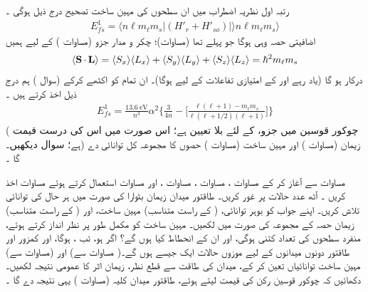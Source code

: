  رتبہ اول نظریہ اضطراب میں ان سطحوں کی مہین ساخت تصحیح درج ذیل ہوگی ۔
\begin{align}\label{مساوات_غیر_مضطرب_نظریہ_اضطراب_پہلی_تصحیح}
E_{fs}^1 = \langle n\ell m_{\ell} m_s | (H'_r + H'_{so}) | \rangle n\ell m_{\ell} m_s \rangle
\end{align}
اضافیتی حصہ وہی ہوگا جو پہلے تھا (مساوات)؛   چکر و مدار جزو  (مساوات )   کے لیے ہمیں
\begin{align}\label{مساوات_غیر_مضطرب_نقطی_ضرب}
\langle \operatorname{\mathbf{S}} \cdot \operatorname{\mathbf{L}} \rangle = \langle S_x \rangle \langle L_x \rangle + \langle S_y \rangle \langle L_y \rangle + \langle S_z \rangle \langle L_z \rangle = \hslash^2 m_{\ell} m_s
\end{align}
درکار ہو گا (یاد  رہے   اور  کے  امتیازی تفاعلات کے لیے  ہوگا)۔   ان تمام کو اکٹھے کرکے (سوال  ) ہم درج ذیل اخذ کرتے ہیں ۔
\begin{align}\label{مساوت_غیر_مضطرب_طاقتور_مہین_ساخت_حصہ}
E_{fs}^1 = \frac{\SI{13.6}{\electronvolt}}{n^3} \alpha^2 \Big \{ \frac{3}{4n} - \Big [ \frac{\ell (\ell  + 1) - m_\ell  m_s}{\ell (\ell  + 1/2)(\ell  + 1)} \Big ] \Big\}
\end{align}
( چوکور  قوسین    میں جزو،    کے لئے بلا تعیین ہے؛  اس  صورت میں اس کی درست قیمت    ہے؛  سوال    دیکھیں۔) زیمان   (مساوات )  اور مہین ساخت   (مساوات  )    حصوں کا مجموعہ کل توانائی دے گا ۔
 
مساوات    سے آغاز کر کے مساوات  ،  مساوات ، مساوات ، اور  مساوات   استعمال کرتے ہوئے مساوات  اخذ کریں ۔
آٹھ عدد  حالات   پر غور کریں۔ طاقتور میدان زیمان بٹوارا  کی صورت میں ہر حال کی توانائی تلاش کریں۔  اپنے جواب کو بوہر توانائی،  (   کے راست متناسب)  مہین ساخت،  اور  (  کے راست متناسب)  زیمان حصہ کے مجموعہ کی صورت میں لکھیں۔ مہین  ساخت کو مکمل طور پر نظر انداز کرتے ہوئے،  منفرد سطحوں کی تعداد کتنی ہوگی،  اور ان کے انحطاط کیا ہوں گے؟ 
اگر  ہو،  تب ،  ہوگا،  اور  کمزور اور طاقتور دونوں میدانوں کے لیے موزوں حالات  ایک  جیسے ہوں گے۔( مساوات  سے)   اور  (مساوات  سے)  مہین ساخت توانائیاں تعین کر کے،  میدان کی طاقت سے قطع نظر،    زیمان اثر کا عمومی نتیجہ لکھیں۔ دکھائیں کہ   چوکور قوسین   رکن کی قیمت   لیتے ہوئے،  طاقتور میدان کلیہ (مساوات  )  یہی نتیجہ دے گا  ۔



